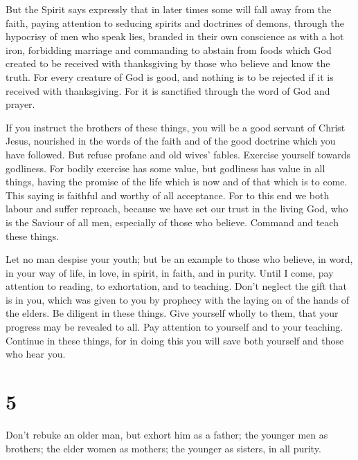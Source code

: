  But the Spirit says expressly that in later times some will
fall away from the faith, paying attention to seducing spirits and
doctrines of demons,  through the hypocrisy of men who speak
lies, branded in their own conscience as with a hot iron, 
forbidding marriage and commanding to abstain from foods which God
created to be received with thanksgiving by those who believe and know
the truth.  For every creature of God is good, and nothing
is to be rejected if it is received with thanksgiving.  For
it is sanctified through the word of God and prayer.

 If you instruct the brothers of these things, you will be a
good servant of Christ Jesus, nourished in the words of the faith and of
the good doctrine which you have followed.  But refuse
profane and old wives' fables. Exercise yourself towards godliness.
 For bodily exercise has some value, but godliness has value
in all things, having the promise of the life which is now and of that
which is to come.  This saying is faithful and worthy of all
acceptance.  For to this end we both labour and suffer
reproach, because we have set our trust in the living God, who is the
Saviour of all men, especially of those who believe. 
Command and teach these things.

 Let no man despise your youth; but be an example to those
who believe, in word, in your way of life, in love, in spirit, in faith,
and in purity.  Until I come, pay attention to reading, to
exhortation, and to teaching.  Don't neglect the gift that
is in you, which was given to you by prophecy with the laying on of the
hands of the elders.  Be diligent in these things. Give
yourself wholly to them, that your progress may be revealed to all.
 Pay attention to yourself and to your teaching. Continue
in these things, for in doing this you will save both yourself and those
who hear you.

\hypertarget{section-4}{%
\section{5}\label{section-4}}

 Don't rebuke an older man, but exhort him as a father; the
younger men as brothers;  the elder women as mothers; the
younger as sisters, in all purity.

